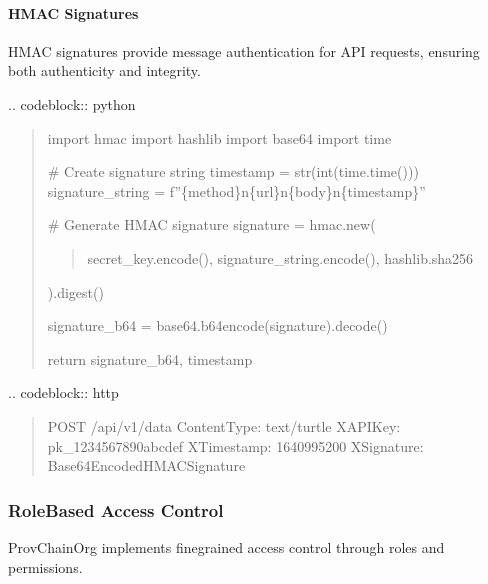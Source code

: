 \documentclass[letterpaper,10pt,english]{sphinxmanual}
\begin{document}
\paragraph{HMAC Signatures}
\label{\detokenize{api/authentication:hmac-signatures}}
\sphinxAtStartPar
HMAC signatures provide message authentication for API requests, ensuring both authenticity and integrity.

\sphinxAtStartPar
{}
.. code\sphinxhyphen{}block:: python
\begin{quote}

\sphinxAtStartPar
import hmac
import hashlib
import base64
import time
\begin{description}
\sphinxAtStartPar
\# Create signature string
timestamp = str(int(time.time()))
signature\_string = f”\{method\}n\{url\}n\{body\}n\{timestamp\}”

\sphinxAtStartPar
\# Generate HMAC signature
signature = hmac.new(
\begin{quote}

\sphinxAtStartPar
secret\_key.encode(),
signature\_string.encode(),
hashlib.sha256
\end{quote}

\sphinxAtStartPar
).digest()

\sphinxAtStartPar
signature\_b64 = base64.b64encode(signature).decode()

\sphinxAtStartPar
return signature\_b64, timestamp

\end{description}
\end{quote}

\sphinxAtStartPar
{}
.. code\sphinxhyphen{}block:: http
\begin{quote}

\sphinxAtStartPar
POST /api/v1/data
Content\sphinxhyphen{}Type: text/turtle
X\sphinxhyphen{}API\sphinxhyphen{}Key: pk\_1234567890abcdef
X\sphinxhyphen{}Timestamp: 1640995200
X\sphinxhyphen{}Signature: Base64EncodedHMACSignature
\end{quote}


\subsubsection{Role\sphinxhyphen{}Based Access Control}
\label{\detokenize{api/authentication:role-based-access-control}}
\sphinxAtStartPar
ProvChainOrg implements fine\sphinxhyphen{}grained access control through roles and permissions.
\end{document}
